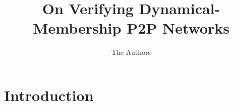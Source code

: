 \documentclass[acm,draft]{paper}
\begin{document}
\title{On Verifying Dynamical-Membership P2P Networks}

\author{The Authors}

\begin{abstract}

\end{abstract}

\maketitle
\pagestyle{plain}

\section{Introduction}
\label{sec:intro}



\end{document}
